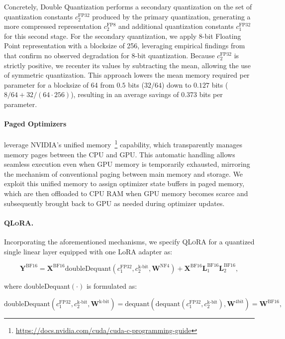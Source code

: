 Concretely, Double Quantization performs a secondary quantization on the set of quantization constants $c_2^{\text{FP32}}$ produced by the primary quantization, generating a more compressed representation $c_2^{\text{FP8}}$ and additional quantization constants $c_1^{\text{FP32}}$ for this second stage. For the secondary quantization, we apply 8-bit Floating Point representation with a blocksize of 256, leveraging empirical findings from \citet{dettmers2022case} that confirm no observed degradation for 8-bit quantization. Because $c_2^{\text{FP32}}$ is strictly positive, we recenter its values by subtracting the mean, allowing the use of symmetric quantization. This approach lowers the mean memory required per parameter for a blocksize of 64 from $0.5$ bits ($32/64$) down to $0.127$ bits ($8/64 + 32/(64\cdot256)$), resulting in an average savings of 0.373 bits per parameter.

\paragraph{Paged Optimizers} leverage NVIDIA's unified memory~\footnote{\tiny \url{https://docs.nvidia.com/cuda/cuda-c-programming-guide}} capability, which transparently manages memory pages between the CPU and GPU. This automatic handling allows seamless execution even when GPU memory is temporarily exhausted, mirroring the mechanism of conventional paging between main memory and storage. We exploit this unified memory to assign optimizer state buffers in paged memory, which are then offloaded to CPU RAM when GPU memory becomes scarce and subsequently brought back to GPU as needed during optimizer updates.

\paragraph{\textsc{QLoRA}.} Incorporating the aforementioned mechanisms, we specify \textsc{QLoRA} for a quantized single linear layer equipped with one LoRA adapter as:

\begin{equation}
    \mathbf{Y}^{\text{BF16}} =  \mathbf{X}^{\text{BF16}} \text{doubleDequant}(c_1^{\text{FP32}}, c_2^{\text{k-bit}}, \mathbf{W}^{\text{NF4}}) + \mathbf{X}^{\text{BF16}}\mathbf{L}^{\text{BF16}}_1\mathbf{L}^{\text{BF16}}_2,
\end{equation}

where doubleDequant$(\cdot)$ is formulated as:

\begin{equation}
    \text{doubleDequant}(c_1^{\text{FP32}}, c_2^{\text{k-bit}}, \mathbf{W}^{\text{k-bit}}) = \text{dequant}(\text{dequant}(c_1^{\text{FP32}}, c_2^{\text{k-bit}}), \mathbf{W}^{\text{4bit}}) = \mathbf{W}^{\text{BF16}},
\end{equation}

